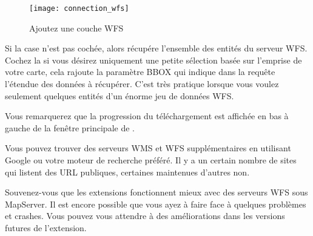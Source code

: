 \begin{figure}[ht]
  \centering
 \texttt{[image: connection\_wfs]}
\caption{Ajoutez une couche WFS\nixcaption}\label{fig:wfs_dmsolutions}
\end{figure}


Si la case  n'est pas cochée, alors \qg récupére l'ensemble des entités du serveur WFS. Cochez la si vous désirez uniquement une petite sélection basée sur l'emprise de votre carte, cela rajoute la paramètre BBOX qui indique dans la requête l'étendue des données à récupérer. C'est très pratique lorsque vous voulez seulement quelques entités d'un énorme jeu de données WFS.

Vous remarquerez que la progression du téléchargement est affichée en bas à
gauche de la fenêtre principale de \qg.
\begin{Tip}[htb]\caption{\textsc{Trouver des serveurs WMS et WFS}}
Vous pouvez trouver des serveurs WMS et WFS supplémentaires en utilisant Google ou votre moteur de recherche préféré. Il y a un certain nombre de sites qui listent des URL publiques, certaines maintenues d'autres non. 
\end{Tip}
Souvenez-vous que les extensions fonctionnent mieux avec des serveurs WFS sous MapServer. Il est encore possible que vous ayez à faire face à quelques problèmes et crashes. Vous pouvez vous attendre à des améliorations dans les versions futures de l'extension.

